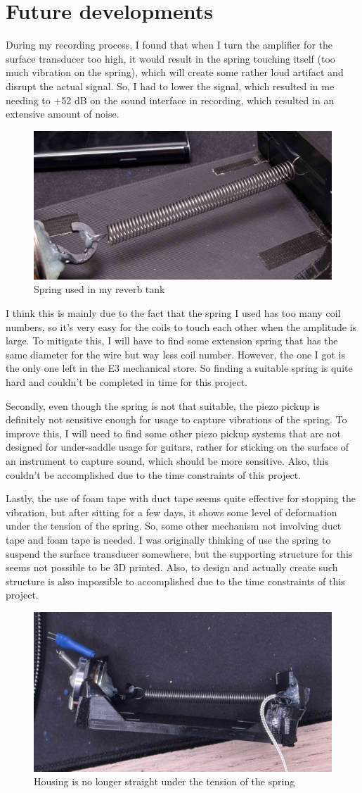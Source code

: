 \documentclass[11pt,a4paper]{article}
\begin{document}
\section{Future developments}

During my recording process, I found that when I turn the amplifier for the surface transducer too high, it would result in the spring touching itself (too much vibration on the spring), which will create some rather loud artifact and disrupt the actual signal. So, I had to lower the signal, which resulted in me needing to +52 dB on the sound interface in recording, which resulted in an extensive amount of noise. 

\begin{figure}[h] 
	\center 
	\includegraphics[width=0.5\linewidth]{spring.jpg} 
	\caption{Spring used in my reverb tank} 
\end{figure} 


I think this is mainly due to the fact that the spring I used has too many coil numbers, so it's very easy for the coils to touch each other when the amplitude is large. To mitigate this, I will have to find some extension spring that has the same diameter for the wire but way less coil number. However, the one I got is the only one left in the E3 mechanical store. So finding a suitable spring is quite hard and couldn't be completed in time for this project. 



Secondly, even though the spring is not that suitable, the piezo pickup is definitely not sensitive enough for usage to capture vibrations of the spring. To improve this, I will need to find some other piezo pickup systems that are not designed for under-saddle usage for guitars, rather for sticking on the surface of an instrument to capture sound, which should be more sensitive. Also, this couldn't be accomplished due to the time constraints of this project. 

Lastly, the use of foam tape with duct tape seems quite effective for stopping the vibration, but after sitting for a few days, it shows some level of deformation under the tension of the spring. So, some other mechanism not involving duct tape and foam tape is needed. I was originally thinking of use the spring to suspend the surface transducer somewhere, but the supporting structure for this seems not possible to be 3D printed. Also, to design and actually create such structure is also impossible to accomplished due to the time constraints of this project.

\begin{figure}[h] 
	\center 
	\includegraphics[width=0.5\linewidth]{deformation.jpg} 
	\caption{Housing is no longer straight under the tension of the spring} 
\end{figure} 
\end{document}
